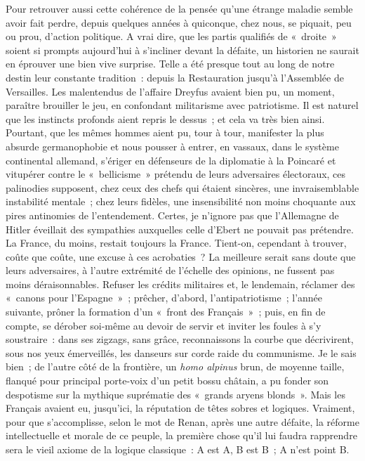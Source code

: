 \documentclass[french,twoside]{book} %
\begin{document}
Pour retrouver aussi cette cohérence de la pensée qu’une étrange maladie semble avoir fait perdre, depuis quelques années à quiconque, chez nous, se piquait, peu ou prou, d’action politique. A vrai dire, que les partis qualifiés de « droite » soient si prompts aujourd’hui à s’incliner devant la défaite, un historien ne saurait en éprouver une bien vive surprise. Telle a été presque tout au long de notre destin leur constante tradition : depuis la Restauration jusqu’à l’Assemblée de Versailles. Les malentendus de l’affaire Dreyfus avaient bien pu, un moment, paraître brouiller le jeu, en confondant militarisme avec patriotisme. Il est naturel que les instincts profonds aient repris le dessus ; et cela va très bien ainsi. Pourtant, que les mêmes hommes aient pu, tour à tour, manifester la plus absurde germanophobie et nous pousser à entrer, en vassaux, dans le système continental allemand, s’ériger en défenseurs de la diplomatie à la Poincaré et vitupérer contre le « bellicisme » prétendu de leurs adversaires électoraux, ces palinodies supposent, chez ceux des chefs qui étaient sincères, une invraisemblable instabilité mentale ; chez leurs fidèles, une insensibilité non moins choquante aux pires antinomies de l’entendement. Certes, je n’ignore pas que l’Allemagne de Hitler éveillait des sympathies auxquelles celle d’Ebert ne pouvait pas prétendre. La France, du moins, restait toujours la France. Tient-on, cependant à trouver, coûte que coûte, une excuse à ces acrobaties ? La meilleure serait sans doute que leurs adversaires, à l’autre extrémité de l’échelle des opinions, ne fussent pas moins déraisonnables. Refuser les crédits militaires et, le lendemain, réclamer des « canons pour l’Espagne » ; prêcher, d’abord,   l’antipatriotisme ; l’année suivante, prôner la formation d’un « front des Français » ; puis, en fin de compte, se dérober soi-même au devoir de servir et inviter les foules à s’y soustraire : dans ses zigzags, sans grâce, reconnaissons la courbe que décrivirent, sous nos yeux émerveillés, les danseurs sur corde raide du communisme. Je le sais bien ; de l’autre côté de la frontière, un {\itshape homo alpinus} brun, de moyenne taille, flanqué pour principal porte-voix d’un petit bossu châtain, a pu fonder son despotisme sur la mythique suprématie des « grands aryens blonds ». Mais les Français avaient eu, jusqu’ici, la réputation de têtes sobres et logiques. Vraiment, pour que s’accomplisse, selon le mot de Renan, après une autre défaite, la réforme intellectuelle et morale de ce peuple, la première chose qu’il lui faudra rapprendre sera le vieil axiome de la logique classique : A est A, B est B ; A n’est point B.\par
\end{document}
